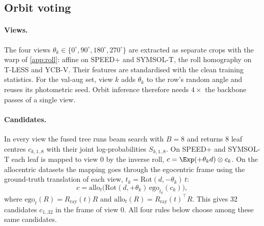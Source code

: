 \subsection{Orbit voting}\label{app:orbit}

\paragraph{Views.}
The four views $\theta_k\in\{0^\circ,90^\circ,180^\circ,270^\circ\}$ are extracted as separate crops with the warp of \cref{app:roll}: affine on SPEED+ and SYMSOL-T, the roll homography on T-LESS and YCB-V. Their features are standardised with the clean training statistics. For the val-aug set, view $k$ adds $\theta_k$ to the row's random angle and reuses its photometric seed. Orbit inference therefore needs $4\times$ the backbone passes of a single view.

\paragraph{Candidates.}
In every view the fused tree runs beam search with $B=8$ and returns 8 leaf centres $c_{k,1..8}$ with their joint log-probabilities $S_{k,1..8}$. On SPEED+ and SYMSOL-T each leaf is mapped to view 0 by the inverse roll, $c=\Exp(+\theta_k d)\otimes c_k$. On the allocentric datasets the mapping goes through the egocentric frame using the ground-truth translation of each view, $t_k=\mathrm{Rot}(d,-\theta_k)\,t$:
\begin{equation}
  c=\mathrm{allo}_{t}\Big(\mathrm{Rot}(d,+\theta_k)\,\mathrm{ego}_{t_k}(c_k)\Big),
\end{equation}
where $\mathrm{ego}_{t}(R)=R_{\text{ray}}(t)R$ and $\mathrm{allo}_{t}(R)=R_{\text{ray}}(t)^\top R$. This gives 32 candidates $c_{1..32}$ in the frame of view 0. All four rules below choose among these same candidates.


